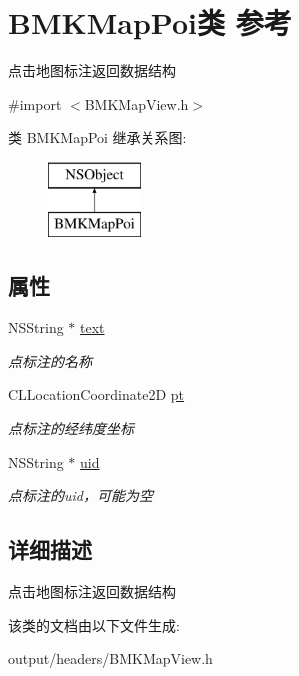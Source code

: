\hypertarget{interface_b_m_k_map_poi}{}\section{B\+M\+K\+Map\+Poi类 参考}
\label{interface_b_m_k_map_poi}


点击地图标注返回数据结构  




{\ttfamily \#import $<$B\+M\+K\+Map\+View.\+h$>$}

类 B\+M\+K\+Map\+Poi 继承关系图\+:\begin{figure}[H]
\begin{center}
\leavevmode
\includegraphics[height=2.000000cm]{interface_b_m_k_map_poi}
\end{center}
\end{figure}
\subsection*{属性}
\begin{DoxyCompactItemize}
\item 
\hypertarget{interface_b_m_k_map_poi_a5d5c19bd352dcab43167d97aa47ea38d}{}N\+S\+String $\ast$ \hyperlink{interface_b_m_k_map_poi_a5d5c19bd352dcab43167d97aa47ea38d}{text}\label{interface_b_m_k_map_poi_a5d5c19bd352dcab43167d97aa47ea38d}

\begin{DoxyCompactList}\small\item\em 点标注的名称 \end{DoxyCompactList}\item 
\hypertarget{interface_b_m_k_map_poi_a771c0672bbe2dd1dc526003717bbcec1}{}C\+L\+Location\+Coordinate2\+D \hyperlink{interface_b_m_k_map_poi_a771c0672bbe2dd1dc526003717bbcec1}{pt}\label{interface_b_m_k_map_poi_a771c0672bbe2dd1dc526003717bbcec1}

\begin{DoxyCompactList}\small\item\em 点标注的经纬度坐标 \end{DoxyCompactList}\item 
\hypertarget{interface_b_m_k_map_poi_a813a15236e6b180973421880e2810835}{}N\+S\+String $\ast$ \hyperlink{interface_b_m_k_map_poi_a813a15236e6b180973421880e2810835}{uid}\label{interface_b_m_k_map_poi_a813a15236e6b180973421880e2810835}

\begin{DoxyCompactList}\small\item\em 点标注的uid，可能为空 \end{DoxyCompactList}\end{DoxyCompactItemize}


\subsection{详细描述}
点击地图标注返回数据结构 

该类的文档由以下文件生成\+:\begin{DoxyCompactItemize}
\item 
output/headers/B\+M\+K\+Map\+View.\+h\end{DoxyCompactItemize}
